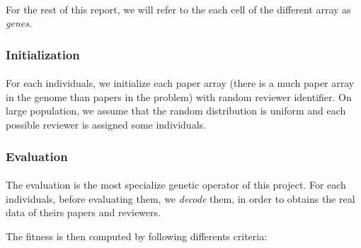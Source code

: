 \documentclass{article}
\begin{document}
      \paragraph{} %
      \label{par:}
        For the rest of this report, we will refer to the each cell of the different
        array as \textit{genes}.
    
    \subsubsection{Initialization} %
    \label{ssub:initialization}
      
      \paragraph{} %
      \label{par:}
      For each individuals, we initialize each paper array (there is a much paper
      array in the genome than papers in the problem) with random reviewer
      identifier. On large population, we assume that the random distribution is
      uniform and each possible reviewer is assigned some individuals. 
      

    \subsubsection{Evaluation} %
    \label{ssub:Evaluation}
      
      \paragraph{} %
      \label{par:}

        The evaluation is the most specialize genetic operator of this project. 
        For each individuals, before evaluating them, we \textit{decode} them, in
        order to obtains the real data of theirs papers and reviewers.

        The fitness is then computed by following differents criteria:
        \\
\end{document}
